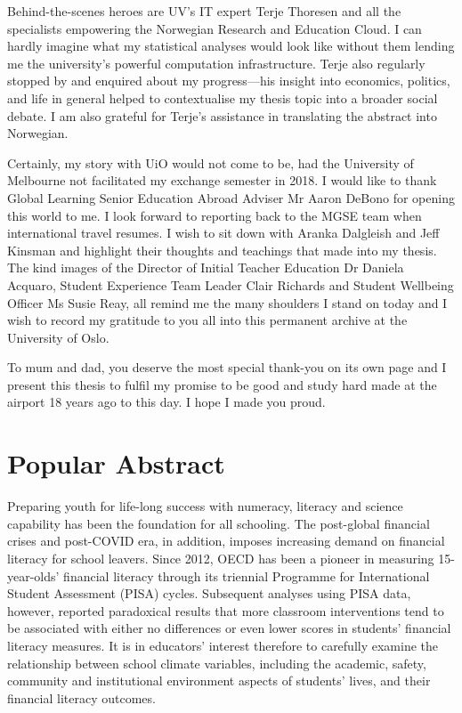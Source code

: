 \documentclass[a4paper,11pt,UKenglish,twoside,openright]{report}\usepackage[]{graphicx}\usepackage[]{color}
\begin{document}
Behind-the-scenes heroes are UV's IT expert Terje Thoresen and all the specialists empowering the Norwegian Research and Education Cloud. I can hardly imagine what my statistical analyses would look like without them lending me the university's powerful computation infrastructure. Terje also regularly stopped by and enquired about my progress---his insight into economics, politics, and life in general helped to contextualise my thesis topic into a broader social debate. I am also grateful for Terje's assistance in translating the abstract into Norwegian.

Certainly, my story with UiO would not come to be, had the University of Melbourne not facilitated my exchange semester in 2018. I would like to thank Global Learning Senior Education Abroad Adviser Mr Aaron DeBono for opening this world to me. I look forward to reporting back to the MGSE team when international travel resumes. I wish to sit down with Aranka Dalgleish and Jeff Kinsman and highlight their thoughts and teachings that made into my thesis. The kind images of the Director of Initial Teacher Education Dr Daniela Acquaro, Student Experience Team Leader Clair Richards and Student Wellbeing Officer Ms Susie Reay, all remind me the many shoulders I stand on today and I wish to record my gratitude to you all into this permanent archive at the University of Oslo.

To mum and dad, you deserve the most special thank-you on its own page and I present this thesis to fulfil my promise to be good and study hard made at the airport 18 years ago to this day. I hope I made you proud.


\chapter*{Popular Abstract}
\label{Ab.0}

Preparing youth for life-long success with numeracy, literacy and science capability has been the foundation for all schooling. The post-global financial crises and post-COVID era, in addition, imposes increasing demand on financial literacy for school leavers. Since 2012, OECD has been a pioneer in measuring 15-year-olds' financial literacy through its triennial Programme for International Student Assessment (PISA) cycles. Subsequent analyses using PISA data, however, reported paradoxical results that more classroom interventions tend to be associated with either no differences or even lower scores in students' financial literacy measures. It is in educators' interest therefore to carefully examine the relationship between school climate variables, including the academic, safety, community and institutional environment aspects of students' lives, and their financial literacy outcomes.
\end{document}
